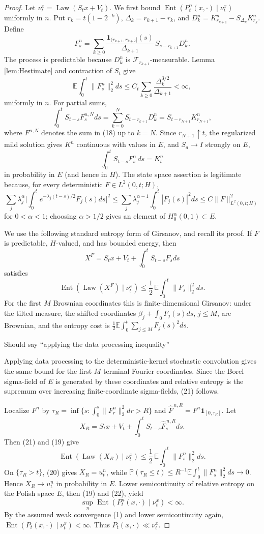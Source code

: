 \documentclass[12pt]{article}
\newcommand{\E}{\mathbb E}
\newcommand{\1}{\mathbf 1}
\newcommand{\Law}{\operatorname{Law}}
\newcommand{\calF}{\mathcal F}
\newcommand{\Ent}{\operatorname{Ent}}
\newcommand{\review}[1]{\begin{reviewbox}#1\end{reviewbox}}
\begin{document}
\begin{proof}
Let \(\nu_t^x=\Law(S_tx+V_t)\).  We first bound
\(\Ent(P_t^n(x,\cdot)\mid\nu_t^x)\) uniformly in \(n\).  Put
\(r_k=t(1-2^{-k})\), \(\Delta_k=r_{k+1}-r_k\), and
\(D_k^n=K^n_{r_{k+1}}-S_{\Delta_k}K^n_{r_k}\).  Define
\[
 F_s^n=\sum_{k\ge0}\frac{\1_{(r_{k+1},r_{k+2}]}(s)}{\Delta_{k+1}}\,
        S_{s-r_{k+1}}D_k^n .                                \tag{18}
\]
The process is predictable because \(D_k^n\) is \(\calF_{r_{k+1}}\)-measurable.
Lemma \ref{lem:Hestimate} and contraction of \(S_t\) give
\[
 \E\int_0^t\|F_s^n\|_2^2ds
 \le C_t\sum_{k\ge0}\frac{\Delta_k^{3/2}}{\Delta_{k+1}}<\infty, \tag{19}
\]
uniformly in \(n\).  For partial sums,
\[
 \int_0^tS_{t-s}F_s^{n,N}ds
 =\sum_{k=0}^NS_{t-r_{k+1}}D_k^n
 =S_{t-r_{N+1}}K^n_{r_{N+1}},
\]
where \(F^{n,N}\) denotes the sum in (18) up to \(k=N\).  Since
\(r_{N+1}\uparrow t\), the regularized mild solution gives \(K^n\) continuous
with values in \(E\), and \(S_a\to I\) strongly on \(E\),
\[
        \int_0^tS_{t-s}F_s^n\,ds=K_t^n                       \tag{20}
\]
in probability in \(E\) (and hence in \(H\)).  The state space assertion is
legitimate because, for every deterministic \(F\in L^2(0,t;H)\),
\[
 \sum_j\lambda_j^\alpha\Big|\int_0^te^{-\lambda_j(t-s)/2}F_j(s)ds\Big|^2
 \le \sum_j\lambda_j^{\alpha-1}\int_0^t|F_j(s)|^2ds
 \le C\|F\|_{L^2(0,t;H)}^2
\]
for \(0<\alpha<1\); choosing \(\alpha>1/2\) gives an element of
\(H^\alpha_0(0,1)\subset E\).

We use the following standard entropy form of Girsanov, and recall its proof.
If \(F\) is predictable, \(H\)-valued, and has bounded energy, then
\[
 X^F=S_tx+V_t+\int_0^tS_{t-s}F_sds
\]
satisfies
\[
        \Ent(\Law(X^F)\mid\nu_t^x)
        \le \frac12\,\E\int_0^t\|F_s\|_2^2ds .               \tag{21}
\]
For the first \(M\) Brownian coordinates this is finite-dimensional
Girsanov: under the tilted measure, the shifted coordinates
\(\beta_j+\int_0^\cdot F_j(s)ds\), \(j\le M\), are Brownian, and the entropy
cost is \(\frac12\E\int_0^t\sum_{j\le M}F_j(s)^2ds\).  \review{Should say ``applying the data processing inequality''} Applying data
processing to the deterministic-kernel stochastic convolution gives the same
bound for the first \(M\) terminal Fourier coordinates.  Since the Borel
sigma-field of \(E\) is generated by these coordinates and relative entropy
is the supremum over increasing finite-coordinate sigma-fields, (21) follows.

Localize \(F^n\) by
\(\tau_R=\inf\{s:\int_0^s\|F_r^n\|_2^2dr>R\}\) and
\(\widehat F^{\,n,R}=F^n\1_{[0,\tau_R]}\).  Let
\[
 X_R=S_tx+V_t+\int_0^tS_{t-s}\widehat F^{\,n,R}_sds .
\]
Then (21) and (19) give
\[
 \Ent(\Law(X_R)\mid\nu_t^x)
 \le \frac12\,\E\int_0^t\|F_s^n\|_2^2ds .                   \tag{22}
\]
On \(\{\tau_R>t\}\), (20) gives \(X_R=u_t^n\), while
\(\mathbb P(\tau_R\le t)\le R^{-1}\E\int_0^t\|F_s^n\|_2^2ds\to0\).  Hence
\(X_R\to u_t^n\) in probability in \(E\).  Lower semicontinuity of relative
entropy on the Polish space \(E\), then (19) and (22), yield
\[
        \sup_n\Ent(P_t^n(x,\cdot)\mid\nu_t^x)<\infty .       \tag{23}
\]
By the assumed weak convergence (1) and lower semicontinuity again,
\(\Ent(P_t(x,\cdot)\mid\nu_t^x)<\infty\).  Thus
\(P_t(x,\cdot)\ll\nu_t^x\).


\end{proof}
\end{document}
